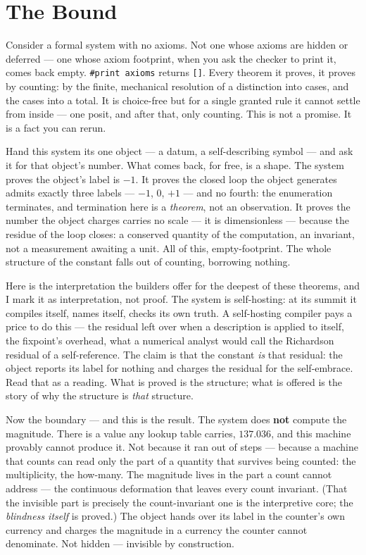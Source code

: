 \chapter{The Bound}

Consider a formal system with no axioms. Not one whose axioms are hidden or deferred --- one whose axiom footprint,
when you ask the checker to print it, comes back empty. \texttt{\#print axioms} returns \texttt{[]}. Every theorem it
proves, it proves by counting: by the finite, mechanical resolution of a distinction into cases, and the cases into a
total. It is choice-free but for a single granted rule it cannot settle from inside --- one posit, and after that,
only counting. This is not a promise. It is a fact you can rerun.

Hand this system its one object --- a datum, a self-describing symbol --- and ask it for that object's number. What
comes back, for free, is a shape. The system proves the object's label is \(-1\). It proves the closed loop the object
generates admits exactly three labels --- \(-1\), \(0\), \(+1\) --- and no fourth: the enumeration terminates, and
termination here is a \emph{theorem}, not an observation. It proves the number the object charges carries no scale ---
it is dimensionless --- because the residue of the loop closes: a conserved quantity of the computation, an invariant,
not a measurement awaiting a unit. All of this, empty-footprint. The whole structure of the constant falls out of
counting, borrowing nothing.

Here is the interpretation the builders offer for the deepest of these theorems, and I mark it as interpretation, not
proof. The system is self-hosting: at its summit it compiles itself, names itself, checks its own truth. A
self-hosting compiler pays a price to do this --- the residual left over when a description is applied to itself, the
fixpoint's overhead, what a numerical analyst would call the Richardson residual of a self-reference. The claim is
that the constant \emph{is} that residual: the object reports its label for nothing and charges the residual for the
self-embrace. Read that as a reading. What is proved is the structure; what is offered is the story of why the
structure is \emph{that} structure.

Now the boundary --- and this is the result. The system does \textbf{not} compute the magnitude. There is a value any
lookup table carries, \(137.036\), and this machine provably cannot produce it. Not because it ran out of steps ---
because a machine that counts can read only the part of a quantity that survives being counted: the multiplicity, the
how-many. The magnitude lives in the part a count cannot address --- the continuous deformation that leaves every
count invariant. (That the invisible part is precisely the count-invariant one is the interpretive core; the
\emph{blindness itself} is proved.) The object hands over its label in the counter's own currency and charges the
magnitude in a currency the counter cannot denominate. Not hidden --- invisible by construction.

